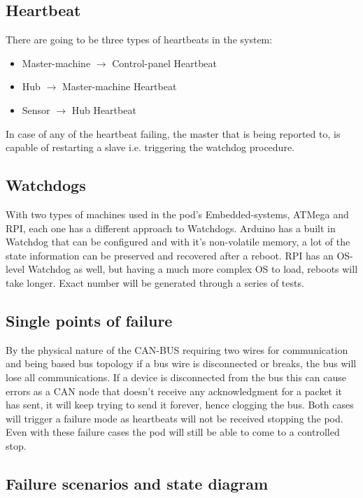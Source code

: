     \subsection{Heartbeat}
    There are going to be three types of heartbeats in the system:
    \begin{itemize}
      \item Master-machine $\rightarrow$ Control-panel Heartbeat
      \item Hub $\rightarrow$ Master-machine Heartbeat
      \item Sensor $\rightarrow$ Hub Heartbeat
    \end{itemize}
    
    In case of any of the heartbeat failing, the master that is being reported to, is capable of restarting a slave i.e. triggering the watchdog procedure.
    
	\subsection{Watchdogs}
    With two types of machines used in the pod's Embedded-systems, ATMega and RPI, each one has a different approach to Watchdogs. Arduino has a built in Watchdog that can be configured and with it's non-volatile memory, a lot of the state information can be preserved and recovered after a reboot. RPI has an OS-level Watchdog as well, but having a much more complex OS to load, reboots will take longer. Exact number will be generated through a series of tests.
   
    \subsection{Single points of failure}
    By the physical nature of the CAN-BUS requiring two wires for communication and being based bus topology if a bus wire is disconnected or breaks, the bus will lose all communications. If a device is disconnected from the bus this can cause errors as a CAN node that doesn't receive any acknowledgment for a packet it has sent, it will keep trying to send it forever, hence clogging the bus. Both cases will trigger a failure mode as heartbeats will not be received stopping the pod. Even with these failure cases the pod will still be able to come to a controlled stop. 
    
    \subsection {Failure scenarios and state diagram}
    
